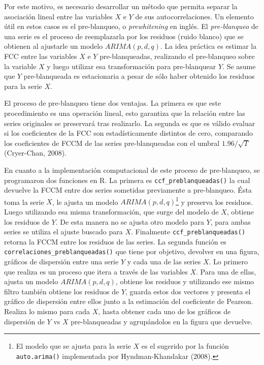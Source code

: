 \documentclass[12pt]{article}
\begin{document}
Por este motivo, es necesario desarrollar un método que permita separar
la asociación lineal entre las variables \(X\) e \(Y\) de sus
autocorrelaciones. Un elemento útil en estos casos es el pre-blanqueo, o
\emph{prewhitening} en inglés. El \emph{pre-blanqueo} de una serie es el
proceso de reemplazarla por los residuos (ruido blanco) que se obtienen
al ajustarle un modelo \(ARIMA(p, d, q)\). La idea práctica es estimar
la FCC entre las variables \(X\) e \(Y\) pre-blanqueadas, realizando el
pre-blanqueo sobre la variable \(X\) y luego utilizar esa transformación
para pre-blanquear \(Y\). Se asume que \(Y\) pre-blanqueada es
estacionaria a pesar de sólo haber obtenido los residuos para la serie
\(X\).

El proceso de pre-blanqueo tiene dos ventajas. La primera es que este
procedimiento es una operación lineal, esto garantiza que la relación
entre las series originales se preservará tras realizarlo. La segunda es
que es válido evaluar si los coeficientes de la FCC son estadísticamente
distintos de cero, comparando los coeficientes de FCCM de las series
pre-blanqueadas con el umbral \(1.96/\sqrt{T}\) (Cryer-Chan, 2008).

En cuanto a la implementación computacional de este proceso de
pre-blanqueo, se programaron dos funciones en R. La primera es
\texttt{ccf\_preblanqueadas()} la cual devuelve la FCCM entre dos series
sometidas previamente a pre-blanqueo. Ésta toma la serie \(X\), le
ajusta un modelo \(ARIMA(p, d, q)\)\footnote{El modelo que se ajusta
  para la serie \(X\) es el sugerido por la función
  \texttt{auto.arima()} implementada por Hyndman-Khandakar (2008).} y
preserva los residuos. Luego utilizando esa misma transformación, que
surge del modelo de \(X\), obtiene los residuos de \(Y\). De esta manera
no se ajusta otro modelo para \(Y\), para ambas series se utiliza el
ajuste buscado para \(X\). Finalmente \texttt{ccf\_preblanqueadas()}
retorna la FCCM entre los residuos de las series. La segunda función es
\texttt{correlaciones\_preblanqueadas()} que tiene por objetivo,
devolver en una figura, gráficos de dispersión entre una serie \(Y\) y
cada una de las series \(X\). Lo primero que realiza es un proceso que
itera a través de las variables \(X\). Para una de ellas, ajusta un
modelo \(ARIMA(p, d, q)\), obtiene los residuos y utilizando ese mismo
filtro también obtiene los residuos de \(Y\), guarda estos dos vectores
y presenta el gráfico de dispersión entre ellos junto a la estimación
del coeficiente de Pearson. Realiza lo mismo para cada \(X\), hasta
obtener cada uno de los gráficos de dispersión de \(Y\) vs \(X\)
pre-blanqueadas y agrupándolos en la figura que devuelve.
\end{document}
